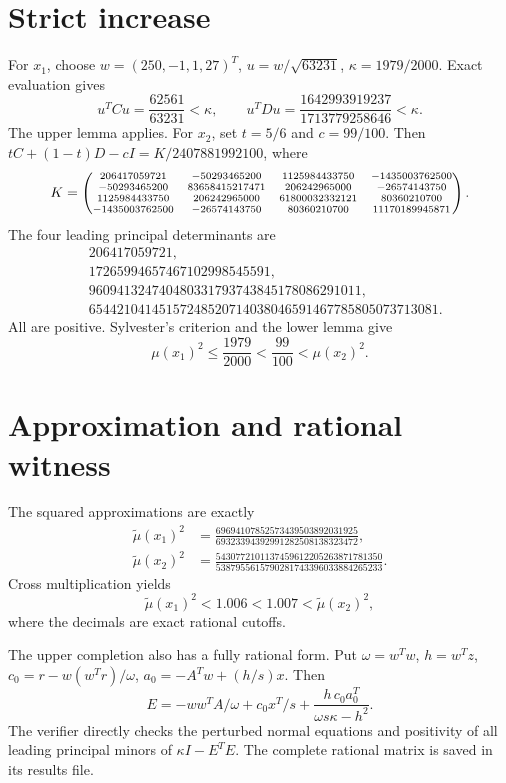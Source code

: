 \documentclass[11pt]{article}
\begin{document}
\section{Strict increase}
For $x_1$, choose $w=(250,-1,1,27)^T$, $u=w/\sqrt{63231}$, $\kappa=1979/2000$. Exact evaluation gives
\[
u^TCu=\frac{62561}{63231}<\kappa,\qquad
u^TDu=\frac{1642993919237}{1713779258646}<\kappa.
\]
The upper lemma applies. For $x_2$, set $t=5/6$ and $c=99/100$. Then $tC+(1-t)D-cI=K/2407881992100$, where
\[
\scriptsize
K=\begin{pmatrix}
206417059721&-50293465200&1125984433750&-1435003762500\\
-50293465200&83658415217471&206242965000&-26574143750\\
1125984433750&206242965000&61800032332121&80360210700\\
-1435003762500&-26574143750&80360210700&11170189945871
\end{pmatrix}.
\]
The four leading principal determinants are
\begin{align*}
&206417059721,\\
&17265994657467102998545591,\\
&960941324740480331793743845178086291011,\\
&65442104145157248520714038046591467785805073713081.
\end{align*}
All are positive. Sylvester's criterion and the lower lemma give
\[\boxed{\mu(x_1)^2\le\frac{1979}{2000}<\frac{99}{100}<\mu(x_2)^2.}\]
\section{Approximation and rational witness}
The squared approximations are exactly
\begin{align*}
\widetilde\mu(x_1)^2&=\frac{69694107852573439503892031925}{69323394392991282508138323472},\\
\widetilde\mu(x_2)^2&=\frac{5430772101137459612205263871781350}{5387955615790281743396033884265233}.
\end{align*}
Cross multiplication yields
\[\boxed{\widetilde\mu(x_1)^2<1.006<1.007<\widetilde\mu(x_2)^2,}\]
where the decimals are exact rational cutoffs.

The upper completion also has a fully rational form. Put $\omega=w^Tw$, $h=w^Tz$, $c_0=r-w(w^Tr)/\omega$, $a_0=-A^Tw+(h/s)x$. Then
\[
E=-ww^TA/\omega+c_0x^T/s+\frac{h\,c_0a_0^T}{\omega s\kappa-h^2}.
\]
The verifier directly checks the perturbed normal equations and positivity of all leading principal minors of $\kappa I-E^TE$. The complete rational matrix is saved in its results file.
\end{document}
